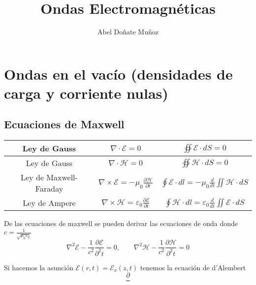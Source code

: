 \documentclass[leqno]{article}
\title{Ondas Electromagnéticas}
\author{Abel Doñate Muñoz}
\date{}
\begin{document}
\maketitle
\tableofcontents
\newpage

\section{Ondas en el vacío (densidades de carga y corriente nulas)}
\subsection{Ecuaciones de Maxwell}
\begin{center}
\begin{tabular}{|c|c|c|}
\hline
Ley de Gauss & $\nabla\cdot \mathcal{E} = 0$  & $\displaystyle\oiint \mathcal{E} \cdot  dS = 0$ \\
\hline
Ley de Gauss & $\nabla\cdot \mathcal{H} = 0$ & $\displaystyle \oiint \mathcal{H} \cdot  dS = 0$ \\
\hline
Ley de Maxwell-Faraday & $\displaystyle\nabla\times \mathcal{E} = -\mu_0 \frac{\partial \mathcal{H}}{\partial t}$ & $\displaystyle\oint \mathcal{E} \cdot  dl = -\mu_0 \frac{d}{dt} \iint \mathcal{H}\cdot dS$ \\
\hline
Ley de Ampere & $\displaystyle\nabla\times \mathcal{H} = \varepsilon _0 \frac{\partial \mathcal{E}}{\partial t}$ & $\displaystyle\oint \mathcal{H}\cdot dl = \varepsilon _0 \frac{d}{dt} \iint \mathcal{E} \cdot dS$ \\
\hline
\end{tabular}
\end{center}

De las ecuaciones de maxwell se pueden derivar las ecuaciones de onda donde $\displaystyle c = \frac{1}{\sqrt{\mu_0 \varepsilon _0} }$
\[
\nabla^2\mathcal{E} - \frac{1}{c^2} \frac{\partial \mathcal{E}}{\partial^2 t} = 0, \qquad 
\nabla^2\mathcal{H} - \frac{1}{c^2} \frac{\partial \mathcal{H}}{\partial^2 t} = 0
\] 

Si hacemos la asunción $\mathcal{E}(r, t) = \mathcal{E}_{x} (z, t)$ tenemos la ecuación de d'Alembert
\[
\frac{\partial}{}
\] 
\end{document}

